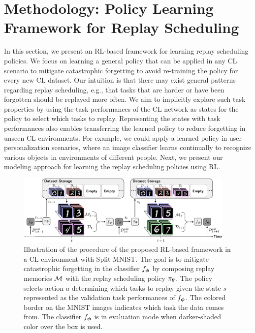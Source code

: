 
\section[Methodology]{Methodology: Policy Learning Framework for Replay Scheduling}\label{paperD:sec:methodology}

In this section, we present an RL-based framework for learning replay scheduling policies. We focus on learning a general policy that can be applied in any CL scenario to mitigate catastrophic forgetting to avoid re-training the policy for every new CL dataset. 
Our intuition is that there may exist general patterns regarding replay scheduling, e.g., that tasks that are harder or have been forgotten should be replayed more often. We aim to implicitly explore such task properties by using the task performances of the CL network as states for the policy to select which tasks to replay. Representing the states with task performances also enables transferring the learned policy to reduce forgetting in unseen CL environments. For example, we could apply a learned policy in user personalization scenarios, where an image classifier learns continually to recognize various objects in environments of different people. 
Next, we present our modeling approach for learning the replay scheduling policies using RL. 

\begin{figure}[t]
	\centering
	\includegraphics[width=0.95\textwidth]{Chapter1/figures/testing_size2.pdf}
	\caption{Illustration of the procedure of the proposed RL-based framework in a CL environment with Split MNIST. The goal is to mitigate catastrophic forgetting in the classifier $f_{{\bm{\phi}}}$ by composing replay memories ${\mathcal{M}}$ with the replay scheduling policy $\pi_{{\bm{\theta}}}$. The policy selects action $a$ determining which tasks to replay given the state $s$ represented as the validation task performances of $f_{{\bm{\phi}}}$. The colored border on the MNIST images indicates which task the data comes from. The classifier $f_{{\bm{\phi}}}$ is in evaluation mode when darker-shaded color over the box is used. %
	}
	\label{fig:rl_framework_pipeline}
	\vspace{-2mm}
\end{figure}

